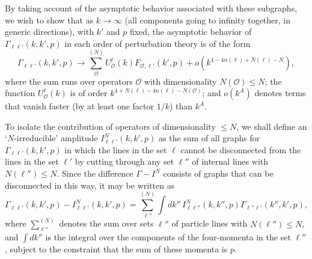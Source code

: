 By taking account of the asymptotic behavior associated with these subgraphs, we wish to show that as $k\to\infty$ (all components going to infinity together, in generic directions), with $k'$ and $p$ fixed, the asymptotic behavior of $\Gamma_{\ell\ell'}(k,k',p)$ in each order of perturbation theory is of the form
\begin{equation}
\Gamma_{\ell\ell'}(k,k',p)
\longrightarrow
\sum_{\mathcal O}^{(N)}
U_{\mathcal O}^{\ell}(k)
F_{\mathcal O,\ell'}(k',p)
+o\left(k^{4-4n(\ell)+N(\ell)-N}\right),
\tag{20.A.4}\label{eq:20.A.4}
\end{equation}
where the sum runs over operators $\mathcal O$ with dimensionality $N(\mathcal O)\leq N$; the function $U_{\mathcal O}^{\ell}(k)$ is of order $k^{4+N(\ell)-4n(\ell)-N(\mathcal O)}$; and $o(k^A)$ denotes terms that vanish faster (by at least one factor $1/k$) than $k^A$.

To isolate the contribution of operators of dimensionality $\leq N$, we shall define an `$N$-irreducible' amplitude $I_{\ell\ell'}^N(k,k',p)$ as the sum of all graphs for $\Gamma_{\ell\ell'}(k,k',p)$ in which the lines in the set $\ell$ cannot be disconnected from the lines in the set $\ell'$ by cutting through any set $\ell''$ of internal lines with $N(\ell'')\leq N$. Since the difference $\Gamma-I^N$ consists of graphs that can be disconnected in this way, it may be written as
\begin{equation}
\Gamma_{\ell\ell'}(k,k',p)-I_{\ell\ell'}^N(k,k',p)
=\sum_{\ell''}^{(N)}
\int dk''\,
I_{\ell\ell''}^N(k,k'',p)
\Gamma_{\ell''\ell'}(k'',k',p),
\tag{20.A.5}\label{eq:20.A.5}
\end{equation}
where $\sum_{\ell''}^{(N)}$ denotes the sum over sets $\ell''$ of particle lines with $N(\ell'')\leq N$, and $\int dk''$ is the integral over the components of the four-momenta in the set $\ell''$, subject to the constraint that the sum of these momenta is $p$.

